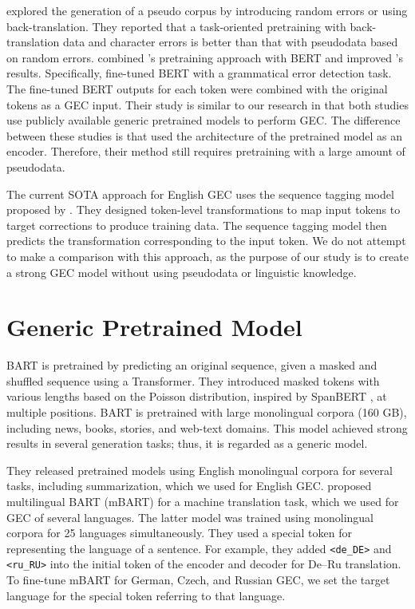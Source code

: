 \documentclass[11pt,a4paper]{article}
\begin{document}
\citet{kiyono2019} explored the generation of a pseudo corpus by introducing random errors or using back-translation.
They reported that a task-oriented pretraining with back-translation data and character errors is better than that with pseudodata based on random errors.
\citet{kaneko_bert} combined \citet{kiyono2019}'s pretraining approach with BERT \cite{bert2019} and improved \citet{kiyono2019}'s results.
Specifically, \citet{kaneko_bert} fine-tuned BERT with a grammatical error detection task.
The fine-tuned BERT outputs for each token were combined with the original tokens as a GEC input.
Their study is similar to our research
 in that both studies use publicly available generic pretrained models to perform GEC.
The difference between these studies is that \citet{kaneko_bert} used the architecture of the pretrained model as an encoder.
Therefore, their method still requires pretraining with a large amount of pseudodata.

The current SOTA approach for English GEC uses the sequence tagging model proposed by \citet{gector}.
They designed token-level transformations to map input tokens to target corrections to produce training data.
The sequence tagging model then predicts the transformation corresponding to the input token.
We do not attempt to make a comparison with this approach,
 as the purpose of our study is to create a strong GEC model without using pseudodata or linguistic knowledge.


\section{Generic Pretrained Model}
BART \cite{bart} is pretrained by predicting an original sequence, given a masked and shuffled sequence using a Transformer.
They introduced masked tokens with various lengths based on the Poisson distribution, inspired by SpanBERT \cite{spanbert}, at multiple positions.
BART is pretrained with large monolingual corpora (160 GB), including news, books, stories, and web-text domains.
This model achieved strong results in several generation tasks; thus, it is regarded as a generic model.

They released pretrained models using English monolingual corpora for several tasks, including summarization, which we used for English GEC.
\citet{m-bart} proposed multilingual BART (mBART) for a machine translation task, which we used for GEC of several languages.
The latter model was trained using monolingual corpora for 25 languages simultaneously.
They used a special token for representing the language of a sentence.
For example, they added \verb|<de_DE>| and \verb|<ru_RU>| into the initial token of the encoder and decoder for De--Ru translation.
To fine-tune mBART for German, Czech, and Russian GEC, we set the target language for the special token referring to that language.
\end{document}
